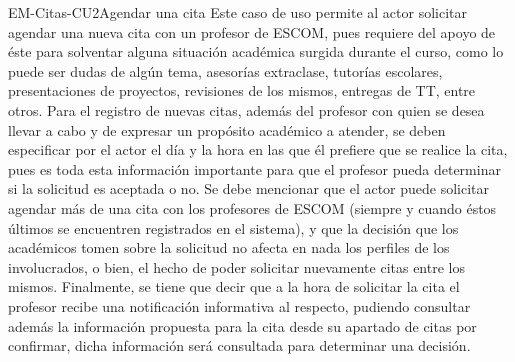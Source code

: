 \begin{UseCase}{EM-Citas-CU2}{Agendar una cita}{
	\noindent
	Este caso de uso permite al actor solicitar agendar una nueva cita con un profesor de ESCOM, pues requiere del apoyo de éste para solventar alguna situación académica surgida durante el curso, como lo puede ser dudas de algún tema, asesorías extraclase, tutorías escolares, presentaciones de proyectos, revisiones de los mismos, entregas de TT, entre otros.
	\newline
	Para el registro de nuevas citas, además del profesor con quien se desea llevar a cabo y de expresar un propósito académico a atender, se deben especificar por el actor el día y la hora en las que él prefiere que se realice la cita, pues es toda esta información importante para que el profesor pueda determinar si la solicitud es aceptada o no.
	\newline
	Se debe mencionar que el actor puede solicitar agendar más de una cita con los profesores de ESCOM (siempre y cuando éstos últimos se encuentren registrados en el sistema), y que la decisión que los académicos tomen sobre la solicitud no afecta en nada los perfiles de los involucrados, o bien, el hecho de poder solicitar nuevamente citas entre los mismos. Finalmente, se tiene que decir que a la hora de solicitar la cita el profesor recibe una notificación informativa al respecto, pudiendo consultar además la información propuesta para la cita desde su apartado de citas por confirmar, dicha información será consultada para determinar una decisión. 
	\newline
	}
\end{UseCase}
